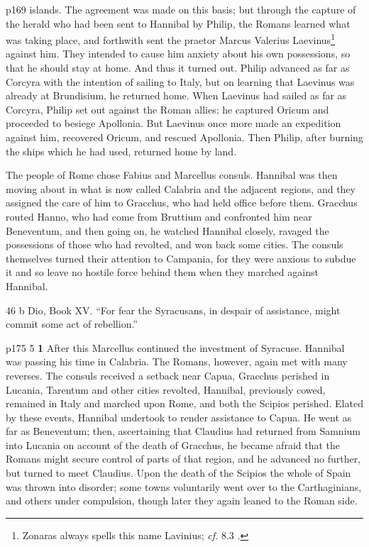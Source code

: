p169 islands. The agreement was made on this basis; but through the capture of the herald who had been sent to Hannibal by Philip, the Romans learned what was taking place, and forthwith sent the praetor Marcus Valerius Laevinus\texthebrew{⁠}\footnote{Zonaras always spells this name Lavinius; \emph{cf.} 8.3 .

} against him. They intended to cause him anxiety about his own possessions, so that he should stay at home. And thus it turned out. Philip advanced as far as Corcyra with the intention of sailing to Italy, but on learning that Laevinus was already at Brundisium, he returned home. When Laevinus had sailed as far as Corcyra, Philip set out against the Roman allies; he captured Oricum and proceeded to besiege Apollonia. But Laevinus once more made an expedition against him, recovered Oricum, and rescued Apollonia. Then Philip, after burning the ships which he had used, returned home by land.

The people of Rome chose Fabius and Marcellus consuls. Hannibal was then moving about in what is now called Calabria and the adjacent regions, and they assigned the care of him to Gracchus, who had held office before them. Gracchus routed Hanno, who had come from Bruttium and confronted him near Beneventum, and then going on, he watched Hannibal closely, ravaged the possessions of those who had revolted, and won back some cities. The consuls themselves turned their attention to Campania, for they were anxious to subdue it and so leave no hostile force behind them when they marched against Hannibal.

46 b Dio, Book XV. ``For fear the Syracusans, in despair of assistance, might commit some act of rebellion.''

p175
5 \textbf{1} After this Marcellus continued the investment of Syracuse. Hannibal was passing his time in Calabria. The Romans, however, again met with many reverses. The consuls received a setback near Capua, Gracchus perished in Lucania, Tarentum and other cities revolted, Hannibal, previously cowed, remained in Italy and marched upon Rome, and both the Scipios perished. Elated by these events, Hannibal undertook to render assistance to Capua. He went as far as Beneventum; then, ascertaining that Claudius had returned from Samnium into Lucania on account of the death of Gracchus, he became afraid that the Romans might secure control of parts of that region, and he advanced no further, but turned to meet Claudius. Upon the death of the Scipios the whole of Spain was thrown into disorder; some towns voluntarily went over to the Carthaginians, and others under compulsion, though later they again leaned to the Roman side.

